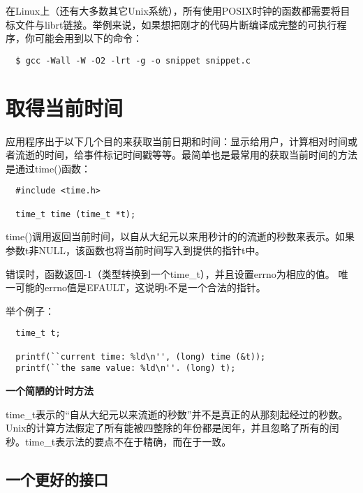 在Linux上（还有大多数其它Unix系统），所有使用POSIX时钟的函数都需要将目标文件与librt链接。举例来说，如果想把刚才的代码片断编译成完整的可执行程序，你可能会用到以下的命令：

\begin{verbatim}
  $ gcc -Wall -W -O2 -lrt -g -o snippet snippet.c
\end{verbatim}

\section{取得当前时间}

应用程序出于以下几个目的来获取当前日期和时间：显示给用户，计算相对时间或者流逝的时间，给事件标记时间戳等等。最简单也是最常用的获取当前时间的方法是通过time()函数：

\begin{lstlisting}
  #include <time.h>

  time_t time (time_t *t);
\end{lstlisting}

time()调用返回当前时间，以自从大纪元以来用秒计的的流逝的秒数来表示。如果参数t非NULL，该函数也将当前时间写入到提供的指针t中。

错误时，函数返回-1（类型转换到一个time\_t），并且设置errno为相应的值。 唯一可能的errno值是EFAULT，这说明t不是一个合法的指针。

举个例子： 

\begin{lstlisting}
  time_t t;

  printf(``current time: %ld\n'', (long) time (&t));
  printf(``the same value: %ld\n''. (long) t);
\end{lstlisting}

\begin{center}
\begin{boxedminipage}{\textwidth}
\begin{center}\textbf{ 一个简陋的计时方法}\end{center}
time\_t表示的“自从大纪元以来流逝的秒数”并不是真正的从那刻起经过的秒数。Unix的计算方法假定了所有能被四整除的年份都是闰年，并且忽略了所有的闰秒。time\_t表示法的要点不在于精确，而在于一致。
\end{boxedminipage}
\end{center}


\subsection{一个更好的接口}

